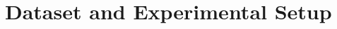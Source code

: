 \documentclass[10pt,twocolumn]{article}
\begin{document}
\section{Dataset and Experimental Setup}



\end{document}
